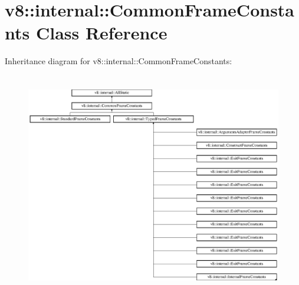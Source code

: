\hypertarget{classv8_1_1internal_1_1_common_frame_constants}{}\section{v8\+:\+:internal\+:\+:Common\+Frame\+Constants Class Reference}
\label{classv8_1_1internal_1_1_common_frame_constants}
Inheritance diagram for v8\+:\+:internal\+:\+:Common\+Frame\+Constants\+:\begin{figure}[H]
\begin{center}
\leavevmode
\includegraphics[height=9.859155cm]{classv8_1_1internal_1_1_common_frame_constants}
\end{center}
\end{figure}
